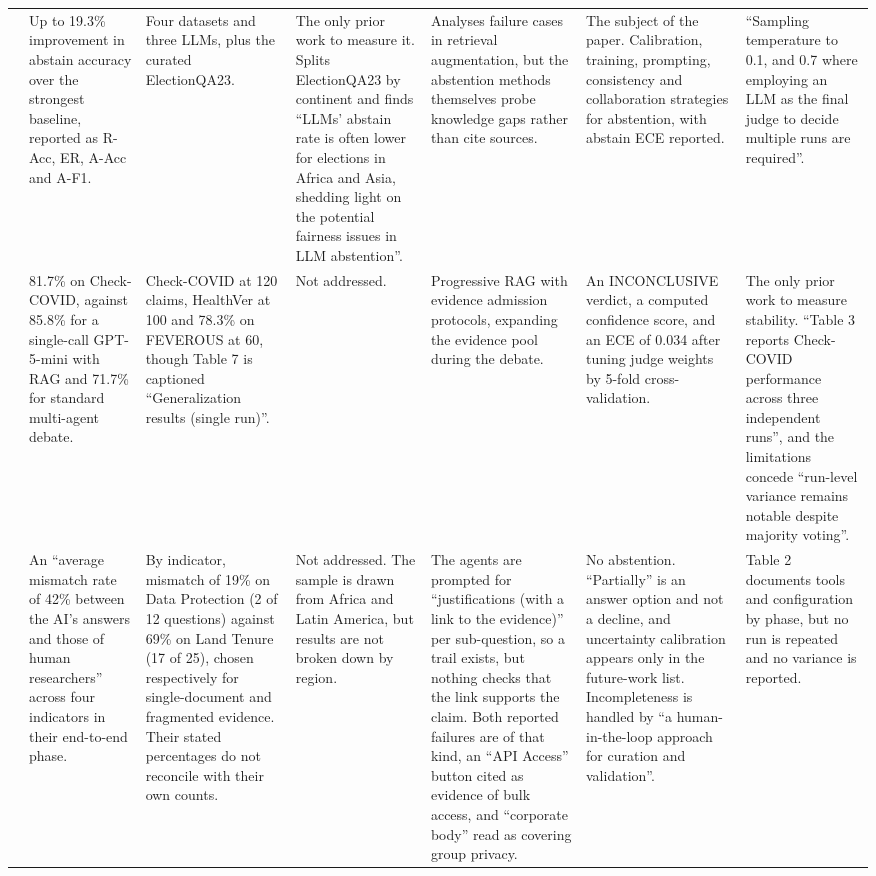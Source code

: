 {\begin{longtable}[]{@{}
  L{0.1427}
  L{0.1428}
  L{0.1429}
  L{0.1427}
  L{0.1428}
  L{0.1430}
  L{0.1429}@{}}
\citet{feng2024} & Up to 19.3\% improvement in abstain accuracy over the strongest baseline, reported as R-Acc, ER, A-Acc and A-F1. & Four datasets and three LLMs, plus the curated ElectionQA23. & The only prior work to measure it. Splits ElectionQA23 by continent and finds ``LLMs' abstain rate is often lower for elections in Africa and Asia, shedding light on the potential fairness issues in LLM abstention''. & Analyses failure cases in retrieval augmentation, but the abstention methods themselves probe knowledge gaps rather than cite sources. & The subject of the paper. Calibration, training, prompting, consistency and collaboration strategies for abstention, with abstain ECE reported. & ``Sampling temperature to 0.1, and 0.7 where employing an LLM as the final judge to decide multiple runs are required''. \\
\citet{chowdhury2026} & 81.7\% on Check-COVID, against 85.8\% for a single-call GPT-5-mini with RAG and 71.7\% for standard multi-agent debate. & Check-COVID at 120 claims, HealthVer at 100 and 78.3\% on FEVEROUS at 60, though Table 7 is captioned ``Generalization results (single run)''. & Not addressed. & Progressive RAG with evidence admission protocols, expanding the evidence pool during the debate. & An INCONCLUSIVE verdict, a computed confidence score, and an ECE of 0.034 after tuning judge weights by 5-fold cross-validation. & The only prior work to measure stability. ``Table 3 reports Check-COVID performance across three independent runs'', and the limitations concede ``run-level variance remains notable despite majority voting''. \\
\citet{fumega2026} & An ``average mismatch rate of 42\% between the AI's answers and those of human researchers'' across four indicators in their end-to-end phase. & By indicator, mismatch of 19\% on Data Protection (2 of 12 questions) against 69\% on Land Tenure (17 of 25), chosen respectively for single-document and fragmented evidence. Their stated percentages do not reconcile with their own counts. & Not addressed. The sample is drawn from Africa and Latin America, but results are not broken down by region. & The agents are prompted for ``justifications (with a link to the evidence)'' per sub-question, so a trail exists, but nothing checks that the link supports the claim. Both reported failures are of that kind, an ``API Access'' button cited as evidence of bulk access, and ``corporate body'' read as covering group privacy. & No abstention. ``Partially'' is an answer option and not a decline, and uncertainty calibration appears only in the future-work list. Incompleteness is handled by ``a human-in-the-loop approach for curation and validation''. & Table 2 documents tools and configuration by phase, but no run is repeated and no variance is reported. \\

\end{longtable}}
